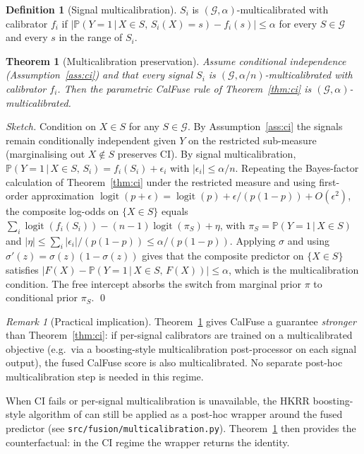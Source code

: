\documentclass[11pt]{article}
\newtheorem{theorem}{Theorem}
\theoremstyle{definition}
\newtheorem{definition}{Definition}
\theoremstyle{remark}
\newtheorem*{remark}{Remark}
\newcommand{\pr}{\mathbb{P}}
\newcommand{\logit}{\operatorname{logit}}
\newcommand{\given}{\,\big|\,}
\begin{document}
\begin{definition}[Signal multicalibration]
$S_i$ is $(\mathcal{G}, \alpha)$-multicalibrated with calibrator $f_i$ if
$|\pr(Y = 1 \given X \in S,\, S_i(X) = s) - f_i(s)| \leq \alpha$ for
every $S \in \mathcal{G}$ and every $s$ in the range of $S_i$.
\end{definition}

\begin{theorem}[Multicalibration preservation]\label{thm:multical}
Assume conditional independence (Assumption~\ref{ass:ci}) and that
every signal $S_i$ is $(\mathcal{G}, \alpha/n)$-multicalibrated with
calibrator $f_i$. Then the parametric CalFuse rule of
Theorem~\ref{thm:ci} is $(\mathcal{G}, \alpha)$-multicalibrated.
\end{theorem}

\begin{proof}[Sketch]
Condition on $X \in S$ for any $S \in \mathcal{G}$. By
Assumption~\ref{ass:ci} the signals remain conditionally independent
given $Y$ on the restricted sub-measure (marginalising out $X \notin S$
preserves CI). By signal multicalibration,
$\pr(Y = 1 \given X \in S,\, S_i) = f_i(S_i) + \epsilon_i$ with
$|\epsilon_i| \leq \alpha / n$. Repeating the Bayes-factor calculation
of Theorem~\ref{thm:ci} under the restricted measure and using
first-order approximation
$\logit(p + \epsilon) = \logit(p) + \epsilon / (p(1-p)) + O(\epsilon^2)$,
the composite log-odds on $\{X \in S\}$ equals
$\sum_i \logit(f_i(S_i)) - (n-1) \logit(\pi_S) + \eta$, with
$\pi_S = \pr(Y=1 \given X \in S)$ and
$|\eta| \leq \sum_i |\epsilon_i| / (p(1-p)) \leq \alpha / (p(1-p))$.
Applying $\sigma$ and using $\sigma'(z) = \sigma(z)(1 - \sigma(z))$
gives that the composite predictor on $\{X \in S\}$ satisfies
$|F(X) - \pr(Y=1 \given X \in S,\, F(X))| \leq \alpha$, which is the
multicalibration condition. The free intercept absorbs the switch
from marginal prior $\pi$ to conditional prior $\pi_S$. \qed
\end{proof}

\begin{remark}[Practical implication]
Theorem~\ref{thm:multical} gives CalFuse a guarantee \emph{stronger}
than Theorem~\ref{thm:ci}: if per-signal calibrators are trained on a
multicalibrated objective (e.g.\ via a boosting-style multicalibration
post-processor on each signal output), the fused CalFuse score is
also multicalibrated. No separate post-hoc multicalibration step is
needed in this regime.

When CI fails or per-signal multicalibration is unavailable, the
HKRR boosting-style algorithm of \citet{hkrr2018multicalibration} can
still be applied as a post-hoc wrapper around the fused predictor
(see \texttt{src/fusion/multicalibration.py}). Theorem~\ref{thm:multical}
then provides the counterfactual: in the CI regime the wrapper
returns the identity.
\end{remark}
\end{document}
